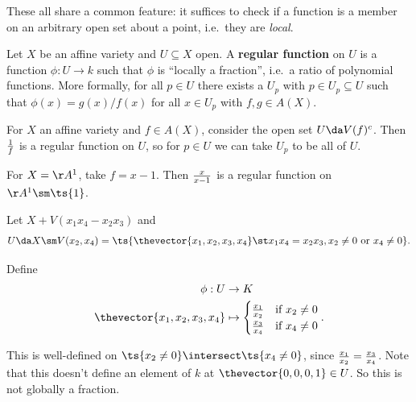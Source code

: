 These all share a common feature: it suffices to check if a function is
a member on an arbitrary open set about a point, i.e.~they are
\emph{local}.

\begin{definition}

Let \(X\) be an affine variety and \(U\subseteq X\) open. A
\textbf{regular function} on \(U\) is a function \(\phi: U\to k\) such
that \(\phi\) is ``locally a fraction'', i.e.~a ratio of polynomial
functions. More formally, for all \(p\in U\) there exists a \(U_p\) with
\(p\in U_p \subseteq U\) such that \(\phi(x) = g(x)/ f(x)\) for all
\(x\in U_p\) with \(f, g\in A(X)\).

\end{definition}

\begin{example}

For \(X\) an affine variety and \(f\in A(X)\), consider the open set
\(U\da V(f)^c\). Then \({1\over f}\) is a regular function on \(U\), so
for \(p\in U\) we can take \(U_p\) to be all of \(U\).

\end{example}

\begin{example}

For \(X = \AA^1\), take \(f=x-1\). Then \({x\over x-1}\) is a regular
function on \(\AA^1 \sm\ts{1}\).

\end{example}

\begin{example}

Let \(X + V(x_1 x_4 - x_2 x_3)\) and
\begin{align*}  
U \da X\sm V(x_2, x_4) = \ts{\thevector{x_1, x_2, x_3, x_4} \st x_1 x_4 = x_2 x_3, x_2\neq 0 \text{ or } x_4\neq 0 }
.\end{align*}

Define
\begin{align*}  
\phi: U &\to K \\
\thevector{x_1, x_2, x_3, x_4} &\mapsto
\begin{cases}
{x_1\over x_2} & \text{if } x_2 \neq 0 \\
{x_3\over x_4} & \text{if } x_4 \neq 0
\end{cases}
.\end{align*}

This is well-defined on \(\ts{x_2\neq 0} \intersect \ts{x_4 \neq 0}\),
since \({x_1\over x_2} = {x_3 \over x_4}\). Note that this doesn't
define an element of \(k\) at \(\thevector{0,0,0,1}\in U\). So this is
not globally a fraction.

\end{example}

